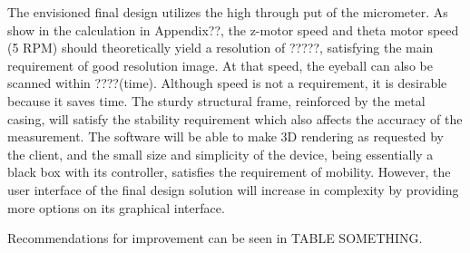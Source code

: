 \documentclass{article}
\begin{document}
 The envisioned final design utilizes the high through put of the micrometer. As show in the calculation in Appendix??, the z-motor speed and theta motor speed (5 RPM) should theoretically yield a resolution of ?????,  satisfying the main requirement of good resolution image. At that speed, the eyeball can also be scanned within ????(time). Although speed is not a requirement, it is desirable because it saves time. The sturdy structural frame, reinforced by the metal casing, will satisfy the stability requirement which also affects the accuracy of the measurement. The software will be able to make 3D rendering as requested by the client, and the small size and simplicity of the device, being essentially a black box with its controller, satisfies the requirement of mobility. However, the user interface of the final design solution will increase in complexity by providing more options on its graphical interface.  

Recommendations for improvement can be seen in TABLE SOMETHING. 

\newpage
{}


\end{document}
